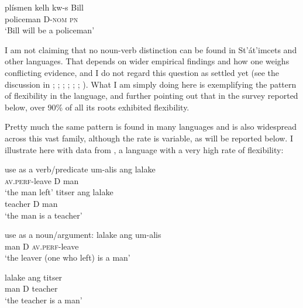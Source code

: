 \documentclass[output=paper]{langsci/langscibook}
\begin{document}
  \ex
  \gll plísmen kelh kw-s Bill\\
  policeman {\fut} D-\textsc{nom} \textsc{pn} \\
  \glt ‘Bill will be a policeman’
   \z
\z

 I am not claiming that no noun-verb distinction can be found in St’át’imcets and other  languages. That depends on wider empirical findings and how one weighs conflicting evidence, and I do not regard this question as settled yet (see the discussion in \citeauthor{Beck2002} ; \citeauthor{DavisEtAl1999} ; \citeauthor{DemirdacheEtAl1994} ; \citeauthor{JelinekEtAl1994} ; \citeauthor{Kinkade1983} ; \citeauthor{Kuipers1968} ; \citeauthor{vanEijkEtAl1986} ). What I am simply doing here is exemplifying the pattern of flexibility in the language, and further pointing out that in the survey reported below, over 90\% of all its roots exhibited flexibility. 

 Pretty much the same pattern is found in many  languages and is also widespread across this vast family, although the rate is variable, as will be reported below. I illustrate here with data from , a language with a very high rate of flexibility: 

 \ea%
 use as a verb/predicate
\ea
\gll um-alis ang lalake\\
\textsc{av.perf}-leave D man\\
\glt ‘the man left’
\ex
\gll titser ang lalake\\
teacher D man \\
\glt ‘the man is a teacher’
 \z
 \z
 
\ea%
 use as a noun/argument:
\ea 
\gll lalake ang um-alis\\
man D \textsc{av.perf}-leave\\
\glt ‘the leaver (one who left) is a man’

\ex
\gll lalake ang titser\\
 man D teacher\\
 ‘the teacher is a man’
\z
\z
\end{document}
